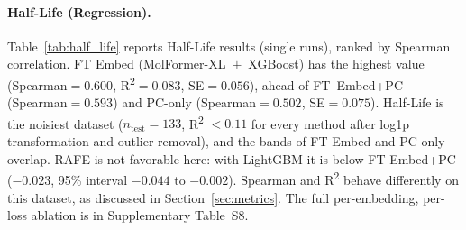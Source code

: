 \documentclass[pdflatex,sn-mathphys-num]{sn-jnl}%
\begin{document}
\begin{table}[!ht]
\centering
\caption{Best configurations on Caco-2 permeability (regression, TDC ADMET Group), ranked by Spearman.}
\label{tab:caco2}
\end{table}

\paragraph{Half-Life (Regression).} Table~\ref{tab:half_life} reports Half-Life results (single runs), ranked by Spearman correlation. FT Embed (MolFormer-XL~$+$~XGBoost) has the highest value (Spearman$=0.600$, R\textsuperscript{2}$=0.083$, SE$=0.056$), ahead of FT~Embed+PC (Spearman$=0.593$) and PC-only (Spearman$=0.502$, SE$=0.075$). Half-Life is the noisiest dataset ($n_\text{test}=133$, R\textsuperscript{2} $< 0.11$ for every method after log1p transformation and outlier removal), and the bands of FT Embed and PC-only overlap. RAFE is not favorable here: with LightGBM it is below FT Embed+PC ($-0.023$, 95\% interval $-0.044$ to $-0.002$). Spearman and R\textsuperscript{2} behave differently on this dataset, as discussed in Section~\ref{sec:metrics}. The full per-embedding, per-loss ablation is in Supplementary Table~S8.
\end{document}
